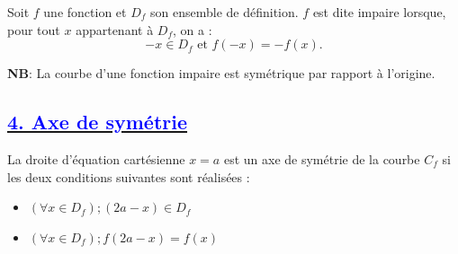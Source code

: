 \documentclass{article}
\begin{document}
Soit $f$ une fonction et $D_f$ son ensemble de définition. $f$ est dite impaire lorsque, pour tout $x$ appartenant à $D_f$, on a :
\[
-x \in D_f \text{ et } f(-x) = -f(x).
\]

\textbf{NB}: La courbe d'une fonction impaire est symétrique par rapport à l’origine.

\begin{center}
\end{center}

\subsection*{\underline{\textbf{\textcolor{blue}{4. Axe de symétrie}}}}
La droite d'équation cartésienne \( x=a \) est un axe de symétrie de la courbe \( C_{f} \) si les deux conditions suivantes sont réalisées :

\begin{itemize}
\item[•] \( (\forall x \in D_{f}) ; ( 2a-x ) \in D_{f} \)
\item[•] \( (\forall x \in D_{f}) ; f( 2a-x )=f(x) \)
\end{itemize}
\end{document}
